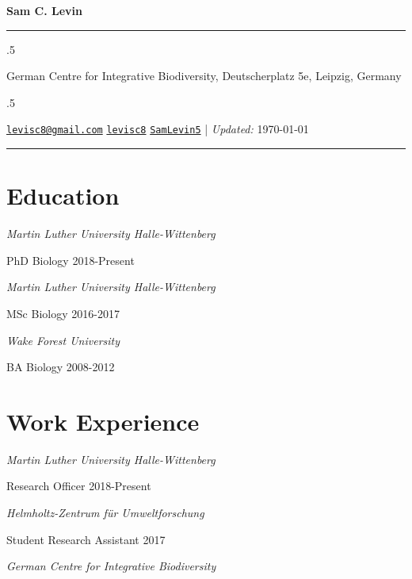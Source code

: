 \documentclass[11pt,]{article}
\begin{document}
\centerline{\huge \bf Sam C. Levin}

\vspace{2 mm}

\hrule

\vspace{2 mm}


\moveleft.5\hoffset\centerline{German Centre for Integrative
Biodiversity, Deutscherplatz 5e, Leipzig, Germany}
\moveleft.5\hoffset\centerline{ \faEnvelopeO \hspace{1 mm} \href{mailto:}{\tt \href{mailto:levisc8@gmail.com}{\nolinkurl{levisc8@gmail.com}}} \hspace{1 mm}  \faGithub \hspace{1 mm} \href{http://github.com/levisc8}{\tt levisc8} \hspace{1 mm}   \faTwitter \hspace{1 mm} \href{https:/twitter.com/SamLevin5}{\tt SamLevin5} \hspace{1 mm}    | \emph{Updated:} \today}

\vspace{2 mm}

\hrule


\hypertarget{education}{%
\section{Education}\label{education}}

\emph{Martin Luther University Halle-Wittenberg}

PhD Biology \hfill 2018-Present

\emph{Martin Luther University Halle-Wittenberg}

MSc Biology \hfill 2016-2017

\emph{Wake Forest University}

BA Biology \hfill 2008-2012

\hypertarget{work-experience}{%
\section{Work Experience}\label{work-experience}}

\emph{Martin Luther University Halle-Wittenberg}

Research Officer \hfill 2018-Present

\emph{Helmholtz-Zentrum für Umweltforschung }

Student Research Assistant \hfill 2017

\emph{German Centre for Integrative Biodiversity}
\end{document}

